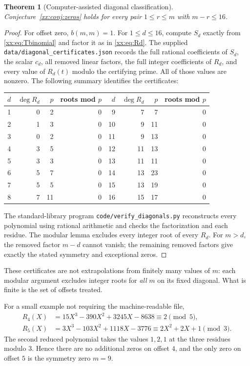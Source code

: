 \documentclass[11pt,a4paper]{article}
\numberwithin{equation}{section}
\newtheorem{theorem}{Theorem}[section]
\theoremstyle{definition}
\theoremstyle{remark}
\theoremstyle{plain}
\begin{document}
\begin{theorem}[Computer-assisted diagonal classification]\label{xx:thm:16}
Conjecture~\ref{xx:conj:zeros} holds for every pair $1\le r\le m$ with
$m-r\le16$.
\end{theorem}
\begin{proof}
For offset zero, $b(m,m)=1$. For $1\le d\le16$, compute $S_d$ exactly from
\eqref{xx:eq:Tbinomial} and factor it as in \eqref{xx:eq:Rd}. The supplied
\texttt{data/diagonal\_certificates.json} records the full rational
coefficients of $S_d$, the scalar $c_d$, all removed linear factors, the
full integer coefficients of $R_d$, and every value of $R_d(t)$ modulo
the certifying prime. All of those values are nonzero. The following
summary identifies the certificates:
\begin{center}
\begin{tabular}{rrrr@{\qquad}rrrr}
\toprule
$d$&$\deg R_d$&$p$&roots mod $p$&$d$&$\deg R_d$&$p$&roots mod $p$\\
\midrule
1&0&2&0&9&7&7&0\\
2&1&3&0&10&9&11&0\\
3&0&2&0&11&9&13&0\\
4&3&5&0&12&11&13&0\\
5&3&3&0&13&11&11&0\\
6&5&7&0&14&13&23&0\\
7&5&5&0&15&13&19&0\\
8&7&11&0&16&15&17&0\\
\bottomrule
\end{tabular}
\end{center}
The standard-library program \texttt{code/verify\_diagonals.py} reconstructs
every polynomial using rational arithmetic and checks the factorization
and each residue. The modular lemma excludes every integer root of every
$R_d$. For $m>d$, the removed factor $m-d$ cannot vanish; the remaining
removed factors give exactly the stated symmetry and exceptional zeros.
\end{proof}

These certificates are not extrapolations from finitely many values of
$m$: each modular argument excludes integer roots for \emph{all} $m$ on
its fixed diagonal. What is finite is the set of offsets treated.

For a small example not requiring the machine-readable file,
\begin{align*}
 R_4(X)&=15X^3-390X^2+3245X-8638\equiv2\pmod5,\\
 R_5(X)&=3X^3-103X^2+1118X-3776
                  \equiv2X^2+2X+1\pmod3.
\end{align*}
The second reduced polynomial takes the values $1,2,1$ at the three
residues modulo $3$. Hence there are no additional zeros on offset $4$,
and the only zero on offset $5$ is the symmetry zero $m=9$.
\end{document}
